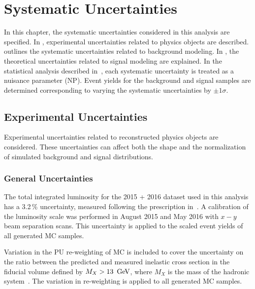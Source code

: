 \chapter{Systematic Uncertainties} 
\label{ch:syst}

In this chapter, the systematic uncertainties considered in this analysis are specified. In \Sect{\ref{ch:syst:exp_unc}}, experimental uncertainties related to physics objects are described. \Sect{\ref{ch:syst:bkg_unc}} outlines the systematic uncertainties related to background modeling.  In \Sect{\ref{ch:syst:sig_unc}}, the theoretical uncertainties related to signal modeling are explained. In the statistical analysis described in~\Ch{\ref{ch:stats}}, each systematic uncertainty is treated as a nuisance parameter (NP). Event yields for the background and signal samples are determined corresponding to varying the systematic uncertainties by $\pm 1\sigma$.

\section{Experimental Uncertainties}
\label{ch:syst:exp_unc}
Experimental uncertainties related to reconstructed physics objects are considered.  These uncertainties can affect both the shape and the normalization of simulated background and signal distributions. 

%
\subsection{General Uncertainties}
The total integrated luminosity for the 2015 + 2016 dataset used in this analysis has a 3.2\,\% uncertainty, measured following the prescription in~. A calibration of the luminosity scale was performed in August 2015 and May 2016 with $x-y$ beam separation scans. This uncertainty is applied to the scaled event yields of all generated MC samples.

Variation in the PU re-weighting of MC is included to cover the uncertainty on the ratio between the predicted and measured inelastic cross section in the fiducial volume defined by $M_X>13\, \GeV$, where $M_X$ is the mass of the hadronic system~\cite{prw_unc}. The variation in re-weighting is applied to all generated MC samples. 

%
